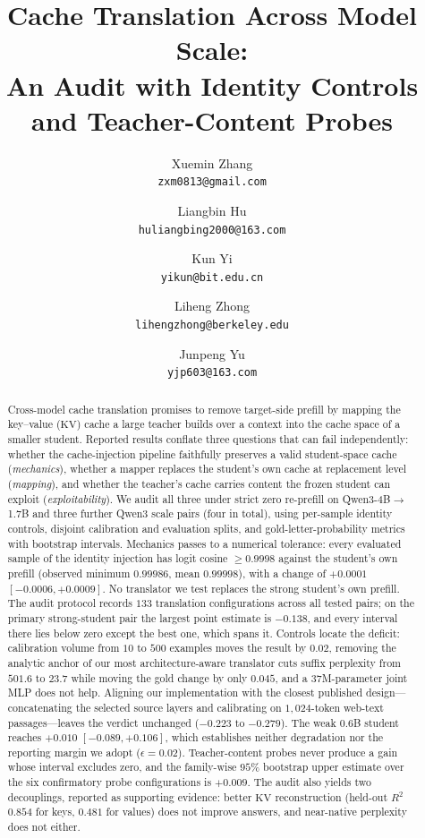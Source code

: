 \documentclass[10pt]{article}
\title{Cache Translation Across Model Scale:\\
An Audit with Identity Controls and Teacher-Content Probes}
\author[1]{Xuemin Zhang\\\texttt{\small zxm0813@gmail.com}}
\author[1]{Liangbin Hu\\\texttt{\small huliangbing2000@163.com}}
\author[1]{Kun Yi\\\texttt{\small yikun@bit.edu.cn}}
\author[1]{Liheng Zhong\\\texttt{\small lihengzhong@berkeley.edu}}
\author[1]{Junpeng Yu\\\texttt{\small yjp603@163.com}}
\affil[1]{CETC}
\date{}
\newcommand{\kv}{\ensuremath{\mathrm{KV}}}
\begin{document}
\maketitle

\begin{abstract}
Cross-model cache translation promises to remove target-side prefill by mapping
the key--value (\kv) cache a large teacher builds over a context into the cache
space of a smaller student. Reported results conflate three questions that can
fail independently: whether the cache-injection pipeline faithfully preserves a
valid student-space cache (\emph{mechanics}), whether a mapper replaces the
student's own cache
at replacement level (\emph{mapping}), and whether the teacher's cache carries
content the frozen student can exploit (\emph{exploitability}). We audit all
three under strict zero re-prefill on Qwen3-4B$\to$1.7B and three further Qwen3
scale pairs (four in total), using per-sample identity controls, disjoint
calibration and evaluation splits, and gold-letter-probability metrics with
bootstrap intervals. Mechanics passes to a numerical tolerance: every evaluated
sample of the identity injection has logit cosine $\ge 0.9998$ against the
student's own prefill (observed minimum $0.99986$, mean $0.99998$), with a change
of $+0.0001$ $[-0.0006,+0.0009]$.
No translator we test replaces the strong student's own prefill. The audit
protocol records $133$ translation configurations across all tested pairs; on
the primary strong-student pair the largest point estimate is $-0.138$, and
every interval there lies below zero except the best one, which spans it. Controls locate the deficit:
calibration volume from $10$ to $500$ examples moves the result by $0.02$,
removing the analytic anchor of our most architecture-aware translator cuts
suffix perplexity from $501.6$ to $23.7$ while moving the gold change by only
$0.045$, and a $37$M-parameter joint MLP does not help. Aligning our
implementation with the closest published design---concatenating
the selected source layers and calibrating on $1{,}024$-token web-text
passages---leaves the verdict unchanged ($-0.223$ to $-0.279$). The weak $0.6$B
student reaches $+0.010$ $[-0.089,+0.106]$, which establishes neither
degradation nor the reporting margin we adopt ($\epsilon{=}0.02$).
Teacher-content probes never produce a gain whose interval excludes zero, and the
family-wise $95\%$ bootstrap upper estimate over the six confirmatory probe
configurations is $+0.009$. The audit also yields two decouplings, reported as
supporting evidence: better \kv{} reconstruction (held-out $R^2$ $0.854$ for
keys, $0.481$ for values) does not improve answers, and near-native perplexity
does not either.
\end{abstract}
\end{document}
